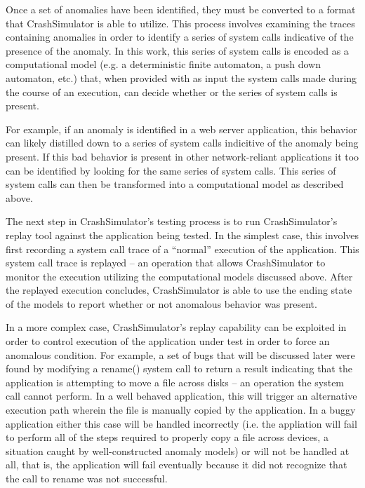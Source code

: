     Once a set of anomalies have been identified, they must be converted to a format that CrashSimulator is able to
    utilize.  This process involves examining the traces containing anomalies in order to identify a series of system
    calls indicative of the presence of the anomaly.  In this work, this series of system calls is encoded as a
    computational model (e.g. a deterministic finite automaton, a push down automaton, etc.) that, when provided with as
    input the system calls made during the course of an execution, can decide whether or the series of system calls is
    present.

    For example, if an anomaly is identified in a web server application, this behavior can likely distilled down to a
    series of system calls indicitive of the anomaly being present.  If this bad behavior is present in other
    network-reliant applications it too can be identified by looking for the same series of system calls.  This series
    of system calls can then be transformed into a computational model as described above.

    The next step in CrashSimulator's testing process is to run CrashSimulator's replay tool against the application
    being tested.  In the simplest case, this involves first recording a system call trace of a ``normal'' execution of
    the application.  This system call trace is replayed -- an operation that allows CrashSimulator to monitor the
    execution utilizing the computational models discussed above.  After the replayed execution concludes,
    CrashSimulator is able to use the ending state of the models to report whether or not anomalous behavior was
    present.

    In a more complex case, CrashSimulator's replay capability can be exploited in order to control execution of the
    application under test in order to force an anomalous condition.  For example, a set of bugs that will be discussed
    later were found by modifying a rename() system call to return a result indicating that the application is
    attempting to move a file across disks -- an operation the system call cannot perform.  In a well behaved
    application, this will trigger an alternative execution path wherein the file is manually copied by the application.
    In a buggy application either this case will be handled incorrectly (i.e. the appliation will fail to perform all of
    the steps required to properly copy a file across devices, a situation caught by well-constructed anomaly models) or
    will not be handled at all, that is, the application will fail eventually because it did not recognize that the call
    to rename was not successful.

